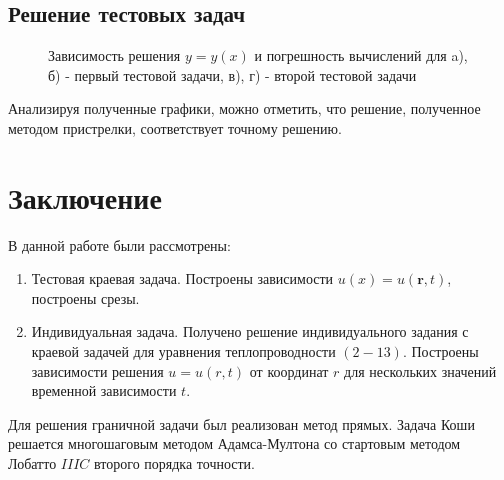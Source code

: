 \documentclass[12pt,a4paper]{article}
\begin{document}
	\subsection{Решение тестовых задач}
	\begin{figure}[h!]
		\begin{minipage}[h]{0.5\linewidth}
		\end{minipage}
		\begin{minipage}[h]{0.5\linewidth}
		\end{minipage}
		\begin{minipage}[h]{0.5\linewidth}
		\end{minipage}
		\begin{minipage}[h]{0.5\linewidth}
		\end{minipage}
		\begin{minipage}[h]{0.5\linewidth}
		\end{minipage}
		\begin{minipage}[h]{0.5\linewidth}
		\end{minipage}
		\caption{Зависимость решения $y = y(x)$ и погрешность вычислений для a), б) - первый тестовой задачи, в), г) - второй тестовой задачи}
	\end{figure}
	\par Анализируя полученные графики, можно отметить, что решение, полученное методом пристрелки, соответствует точному решению.
	
	
	
	
	\newpage
	\section*{Заключение}
	 \hspace*{1cm}
	В данной работе были рассмотрены:
	\begin{enumerate}
		\item Тестовая краевая задача. Построены зависимости $u(x) = u(\textbf{r} , t)$, построены срезы.
		\item Индивидуальная задача. Получено решение индивидуального задания с краевой задачей для уравнения теплопроводности $(2 - 13)$.
		Построены зависимости решения $u = u(r, t)$ от координат $r$ для нескольких значений временной зависимости $t$.
	\end{enumerate}
	Для решения граничной задачи был реализован метод прямых. Задача Коши решается многошаговым методом Адамса-Мултона со стартовым методом Лобатто $IIIC$ второго порядка точности.\\
	
\end{document}
